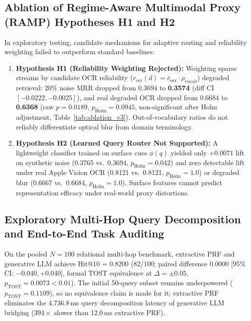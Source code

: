 \subsection{Ablation of Regime-Aware Multimodal Proxy (RAMP) Hypotheses H1 and H2}
In exploratory testing, candidate mechanisms for adaptive routing and reliability weighting failed to outperform standard baselines:
\begin{enumerate}
    \setlength{\itemsep}{0pt}
    \setlength{\parskip}{0pt}
    \setlength{\parsep}{0pt}
    \setlength{\topsep}{1pt}
    \item \textbf{Hypothesis H1 (Reliability Weighting Rejected):} Weighting sparse streams by candidate OCR reliability ($r_{\text{ocr}}(d) = \bar{c}_{\text{ocr}} \cdot \rho_{\text{vocab}}$) degraded retrieval: 20\% noise MRR dropped from 0.3694 to \textbf{0.3574} (diff CI $[-0.0222, -0.0025]$), and real degraded OCR dropped from 0.6684 to \textbf{0.6368} (raw $p = 0.0189$, $p_{\text{Holm}} = 0.0945$, non-significant after Holm adjustment, Table~\ref{tab:ablation_v3}). Out-of-vocabulary ratios do not reliably differentiate optical blur from domain terminology.
    \item \textbf{Hypothesis H2 (Learned Query Router Not Supported):} A lightweight classifier trained on surface cues $\phi(q)$ yielded only $+0.0071$ lift on synthetic noise (0.3765 vs.\ 0.3694, $p_{\text{Holm}}=0.042$) and zero detectable lift under real Apple Vision OCR (0.8121 vs.\ 0.8121, $p_{\text{Holm}}=1.0$) or degraded blur (0.6667 vs.\ 0.6684, $p_{\text{Holm}}=1.0$). Surface features cannot predict representation efficacy under real-world proxy distortions.
\end{enumerate}

\subsection{Exploratory Multi-Hop Query Decomposition and End-to-End Task Auditing}
\label{sec:multihop_reasoning}
On the pooled $N=100$ relational multi-hop benchmark, extractive PRF and generative LLM achieve Hit@10 = $0.8200$ (82/100; paired difference $0.0000$ [95\% CI: $-0.040, +0.040$], formal TOST equivalence at $\Delta = \pm 0.05$, $p_{\text{TOST}} = 0.0073 < 0.01$). The initial 50-query subset remains underpowered ($p_{\text{TOST}}=0.1109$), so no equivalence claim is made for it; extractive PRF eliminates the 4,736.8\,ms query decomposition latency of generative LLM bridging ($394\times$ slower than 12.0\,ms extractive PRF).

